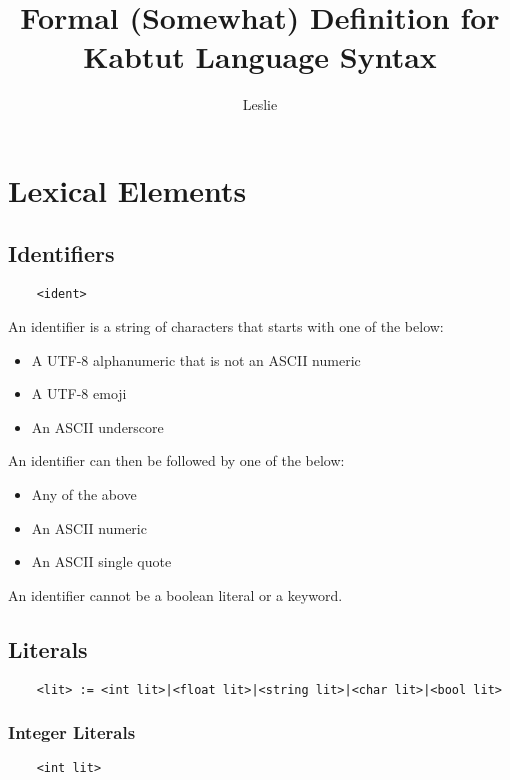 \documentclass[a4paper]{article}
\title{Formal (Somewhat) Definition for Kabtut Language Syntax}
\author{Leslie}
\begin{document}
\maketitle

\section{Lexical Elements}

\subsection{Identifiers}

\begin{verbatim}
    <ident>
\end{verbatim}

An identifier is a string of characters that starts with one of the below:

\begin{itemize}
    \item A UTF-8 alphanumeric that is not an ASCII numeric
    \item A UTF-8 emoji
    \item An ASCII underscore
\end{itemize}

An identifier can then be followed by one of the below:

\begin{itemize}
    \item Any of the above
    \item An ASCII numeric
    \item An ASCII single quote
\end{itemize}

An identifier cannot be a boolean literal or a keyword.

\subsection{Literals}

\begin{verbatim}
    <lit> := <int lit>|<float lit>|<string lit>|<char lit>|<bool lit>
\end{verbatim}

\subsubsection{Integer Literals}

\begin{verbatim}
    <int lit>
\end{verbatim}
\end{document}
